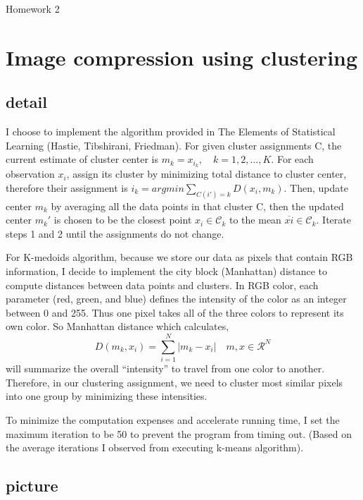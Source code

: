 \documentclass{article}
\begin{document}
\begin{center}
{\huge Homework 2}
\end{center}

\section{Image compression using clustering}
\bigskip

\subsection{detail}
I choose to implement the algorithm provided in The Elements of Statistical Learning (Hastie, Tibshirani, Friedman). For given cluster assignments C, the current estimate of cluster center is $m_k = x_i_k, \quad k = 1, 2, ..., K$. For each observation $x_i$, assign its cluster by minimizing total distance to cluster center, therefore their assignment is $i_k = argmin \sum_{C(i')=k} D(x_i, m_k)$. Then, update center $m_k$ by averaging all the data points in that cluster C, then the updated center $m_k'$ is chosen to be the closest point $x_i \in \mathcal C_k$ to the mean $\overline{xi} \in \mathcal C_k$. Iterate steps 1 and 2 until the assignments do not change.
\medskip

For K-medoids algorithm, because we store our data as pixels that contain RGB information, I decide to implement the city block (Manhattan) distance to compute distances between data points and clusters. In RGB color, each parameter (red, green, and blue) defines the intensity of the color as an integer between 0 and 255. Thus one pixel takes all of the three colors to represent its own color. So Manhattan distance which calculates,
$$
D(m_k, x_i) = \sum_{i = 1}^{N} |m_k - x_i| \quad m, x \in \mathcal{R}^N
$$
will summarize the overall ``intensity'' to travel from one color to another. Therefore, in our clustering assignment, we need to cluster most similar pixels into one group by minimizing these intensities.
\medskip

To minimize the computation expenses and accelerate running time, I set the maximum iteration to be 50 to prevent the program from timing out. (Based on the average iterations I observed from executing k-means algorithm).
\bigskip

\subsection{picture}
\medskip
\end{document}
